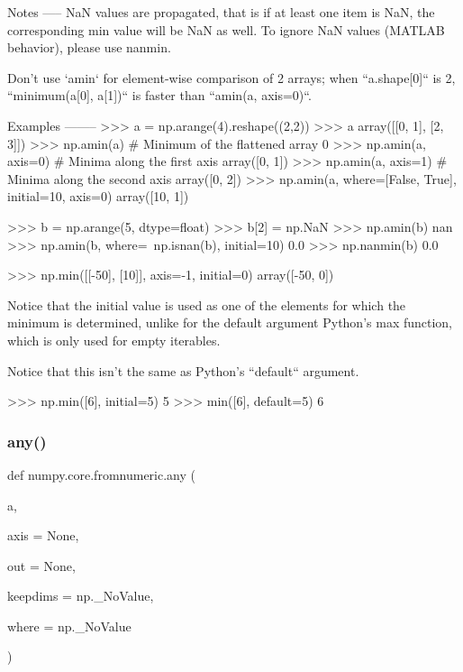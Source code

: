 \begin{DoxyVerb}
Notes
-----
NaN values are propagated, that is if at least one item is NaN, the
corresponding min value will be NaN as well. To ignore NaN values
(MATLAB behavior), please use nanmin.

Don't use `amin` for element-wise comparison of 2 arrays; when
``a.shape[0]`` is 2, ``minimum(a[0], a[1])`` is faster than
``amin(a, axis=0)``.

Examples
--------
>>> a = np.arange(4).reshape((2,2))
>>> a
array([[0, 1],
       [2, 3]])
>>> np.amin(a)           # Minimum of the flattened array
0
>>> np.amin(a, axis=0)   # Minima along the first axis
array([0, 1])
>>> np.amin(a, axis=1)   # Minima along the second axis
array([0, 2])
>>> np.amin(a, where=[False, True], initial=10, axis=0)
array([10,  1])

>>> b = np.arange(5, dtype=float)
>>> b[2] = np.NaN
>>> np.amin(b)
nan
>>> np.amin(b, where=~np.isnan(b), initial=10)
0.0
>>> np.nanmin(b)
0.0

>>> np.min([[-50], [10]], axis=-1, initial=0)
array([-50,   0])

Notice that the initial value is used as one of the elements for which the
minimum is determined, unlike for the default argument Python's max
function, which is only used for empty iterables.

Notice that this isn't the same as Python's ``default`` argument.

>>> np.min([6], initial=5)
5
>>> min([6], default=5)
6
\end{DoxyVerb}
 \mbox{\label{namespacenumpy_1_1core_1_1fromnumeric_a99de6cfe9e42f421be2a279e9d287eae}} 
\subsubsection{\texorpdfstring{any()}{any()}}
{\footnotesize\ttfamily def numpy.\+core.\+fromnumeric.\+any (\begin{DoxyParamCaption}\item[{}]{a,  }\item[{}]{axis = {\ttfamily None},  }\item[{}]{out = {\ttfamily None},  }\item[{}]{keepdims = {\ttfamily np.\+\_\+NoValue},  }\item[{}]{where = {\ttfamily np.\+\_\+NoValue} }\end{DoxyParamCaption})}

